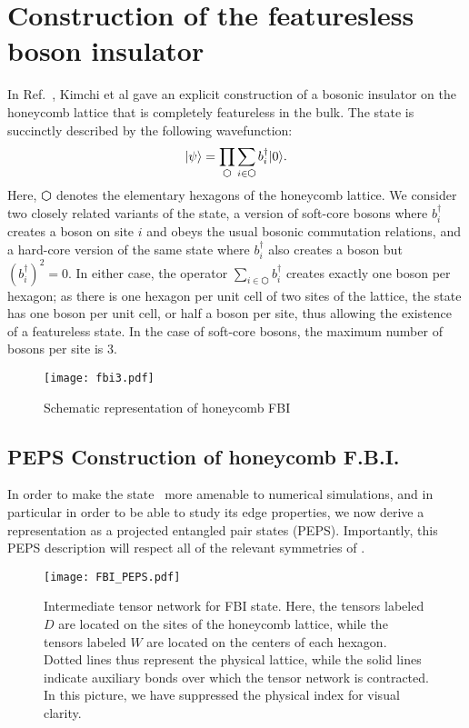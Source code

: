 
\section{Construction of the featuresless boson insulator}

In Ref.~, Kimchi et al gave an explicit
construction of a bosonic insulator
on the honeycomb lattice that is completely featureless in the bulk.
The state is succinctly described by the following wavefunction:
\begin{equation} \label{eq:def}
\ket{\psi} = \prod\limits_{\varhexagon} \sum\limits_{i \in
\varhexagon} b^{\dagger}_{i} \ket{0}.
\end{equation}
Here, $\varhexagon$ denotes the elementary hexagons of the honeycomb
lattice. We consider two closely related variants of the state, a
version of soft-core bosons where $b_i^\dagger$ creates a boson on
site $i$ and obeys the usual bosonic commutation relations, and a
hard-core version of the same state where $b_i^\dagger$ also creates a
boson but $(b_i^\dagger)^2=0$. In either case, the operator $\sum_{i
\in \varhexagon} b^{\dagger}_{i}$ creates exactly one boson per
hexagon; as there is one hexagon per unit cell of two sites of the
lattice, the state has one boson per unit cell, or half a boson per
site, thus allowing the existence of a featureless state.
In the case of soft-core bosons, the maximum number of bosons
per site is 3.

\begin{figure}
	\centering
	\texttt{[image: fbi3.pdf]}
	\caption{Schematic representation of honeycomb FBI}
\end{figure}

\subsection{PEPS Construction of honeycomb F.B.I.}

In order to make the state~ more amenable to numerical
simulations, and in particular in order to be able to study its edge
properties, we now derive a representation as a projected entangled
pair states (PEPS). Importantly, this PEPS description will respect
all of the relevant symmetries of .

\begin{figure}
	\centering
	\texttt{[image: FBI\_PEPS.pdf]}
	\caption{
	Intermediate tensor network for FBI state. Here, the tensors labeled
	$D$ are located on the sites of the honeycomb lattice, while the
	tensors labeled $W$ are located on the centers of each hexagon.
	Dotted lines thus represent the physical lattice, while the solid
	lines indicate auxiliary bonds over which the tensor network is
	contracted. In this picture, we have suppressed the physical index
	for visual clarity.}
	\label{fig:FBI_PEPS}
\end{figure}

